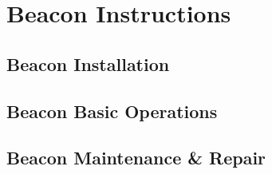 

\setcounter{section}{1}
\section{Beacon Instructions}

\bigskip

\subsection{Beacon Installation}
\subsection{Beacon Basic Operations}
\subsection{Beacon Maintenance \& Repair}